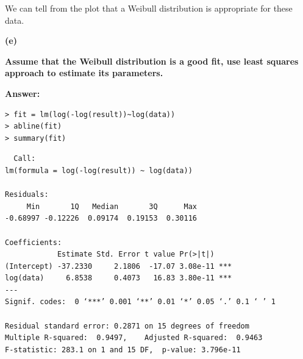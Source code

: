 \documentclass[letterpaper,11pt]{article}
\begin{document}
\begin{center} 
\end{center}
We can tell from the plot that a Weibull distribution is appropriate for these data.

\begin{addmargin}[-1.1em]{0em}
  \textbf{(e)}\par
\end{addmargin}
\textbf{Assume that the Weibull distribution is a good fit, use least squares approach to estimate its parameters.}\par
\bigbreak
\begin{addmargin}[-0.5em]{0em}
  \textbf{Answer: }
\end{addmargin}

\begin{lstlisting}
> fit = lm(log(-log(result))~log(data))
> abline(fit)
> summary(fit)
\end{lstlisting}

\begin{lstlisting}
  Call:
lm(formula = log(-log(result)) ~ log(data))

Residuals:
     Min       1Q   Median       3Q      Max
-0.68997 -0.12226  0.09174  0.19153  0.30116

Coefficients:
            Estimate Std. Error t value Pr(>|t|)
(Intercept) -37.2330     2.1806  -17.07 3.08e-11 ***
log(data)     6.8538     0.4073   16.83 3.80e-11 ***
---
Signif. codes:  0 ‘***’ 0.001 ‘**’ 0.01 ‘*’ 0.05 ‘.’ 0.1 ‘ ’ 1

Residual standard error: 0.2871 on 15 degrees of freedom
Multiple R-squared:  0.9497,	Adjusted R-squared:  0.9463
F-statistic: 283.1 on 1 and 15 DF,  p-value: 3.796e-11
\end{lstlisting}
\end{document}
